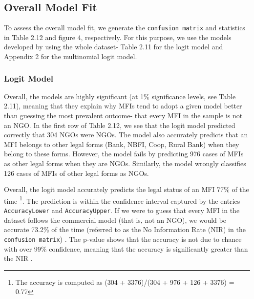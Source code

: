 \documentclass[a4paper, nobind]{templates/ociamthesis}
\begin{document}
\hypertarget{overall-model-fit}{%
\subsection{Overall Model Fit}\label{overall-model-fit}}

To assess the overall model fit, we generate the \texttt{confusion\ matrix} and statistics in Table 2.12 and figure 4, respectively. For this purpose, we use the models developed by using the whole dataset- Table 2.11 for the logit model and Appendix 2 for the multinomial logit model.

\hypertarget{logit-model}{%
\subsubsection{Logit Model}\label{logit-model}}

Overall, the models are highly significant (at 1\% significance levels, see Table 2.11), meaning that they explain why MFIs tend to adopt a given model better than guessing the most prevalent outcome- that every MFI in the sample is not an NGO. In the first row of Table 2.12, we see that the logit model predicted correctly that 304 NGOs were NGOs. The model also accurately predicts that an MFI belongs to other legal forms (Bank, NBFI, Coop, Rural Bank) when they belong to these forms. However, the model fails by predicting 976 cases of MFIs as other legal forms when they are NGOs. Similarly, the model wrongly classifies 126 cases of MFIs of other legal forms as NGOs.

Overall, the logit model accurately predicts the legal status of an MFI 77\% of the time \footnote{The accuracy is computed as (304 + 3376)/(304 + 976 + 126 + 3376) = 0.77}. The prediction is within the confidence interval captured by the entries \texttt{AccuracyLower} and \texttt{AccuracyUpper}. If we were to guess that every MFI in the dataset follows the commercial model (that is, not an NGO), we would be accurate 73.2\% of the time (referred to as the No Information Rate (NIR) in the \texttt{confusion\ matrix}) \autocite{cavalin2018confusion}. The p-value shows that the accuracy is not due to chance with over 99\% confidence, meaning that the accuracy is significantly greater than the NIR \autocite{kleinbaum2002logistic}.
\end{document}
